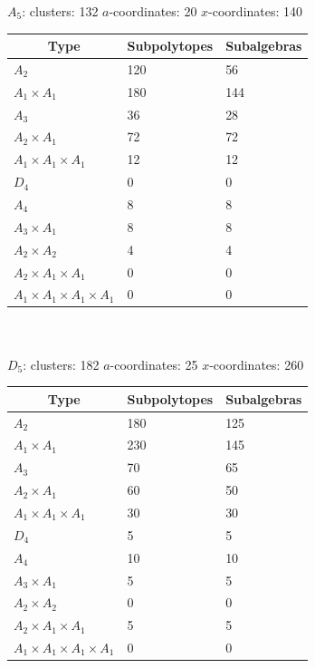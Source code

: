 \documentclass[11pt]{article}
\begin{document}
{\Large\underline{\(A_5\)}:} \quad clusters: 132 \qquad \(a\)-coordinates: 20 \qquad \(x\)-coordinates: 140\\

\begin{tabular}{ | l | l | l |}
\multicolumn{1}{c}{Type} &  \multicolumn{1}{c}{Subpolytopes}  &  \multicolumn{1}{c}{Subalgebras} \\
\hline \(A_2\) & 120 & 56 \\ 
\hline \(A_1 \times A_1\) & 180 & 144 \\ \hline 
\hline \(A_3\) & 36 & 28 \\ 
\hline \(A_2 \times A_1\) & 72 & 72 \\ 
\hline \(A_1 \times A_1 \times A_1\) & 12 & 12 \\ \hline 
\hline \(D_4\) & 0 & 0 \\ 
\hline \(A_4\) & 8 & 8 \\ 
\hline \(A_3 \times A_1\) & 8 & 8 \\ 
\hline \(A_2 \times A_2\) & 4 & 4 \\ 
\hline \(A_2 \times A_1 \times A_1\) & 0 & 0 \\ 
\hline \(A_1 \times A_1 \times A_1 \times A_1\) & 0 & 0 \\ 
\hline
\end{tabular} \\ \\


{\Large\underline{\(D_5\)}:} \quad clusters: 182 \qquad \(a\)-coordinates: 25 \qquad \(x\)-coordinates: 260\\

\begin{tabular}{ | l | l | l |}
\multicolumn{1}{c}{Type} &  \multicolumn{1}{c}{Subpolytopes}  &  \multicolumn{1}{c}{Subalgebras} \\
\hline \(A_2\) & 180 & 125 \\ 
\hline \(A_1 \times A_1\) & 230 & 145 \\ \hline 
\hline \(A_3\) & 70 & 65 \\ 
\hline \(A_2 \times A_1\) & 60 & 50 \\ 
\hline \(A_1 \times A_1 \times A_1\) & 30 & 30 \\ \hline 
\hline \(D_4\) & 5 & 5 \\ 
\hline \(A_4\) & 10 & 10 \\ 
\hline \(A_3 \times A_1\) & 5 & 5 \\ 
\hline \(A_2 \times A_2\) & 0 & 0 \\ 
\hline \(A_2 \times A_1 \times A_1\) & 5 & 5 \\ 
\hline \(A_1 \times A_1 \times A_1 \times A_1\) & 0 & 0 \\ 
\hline
\end{tabular} \\ \\ 
\end{document}
